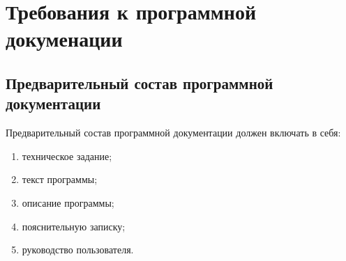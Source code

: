 \documentclass[a4paper,14pt]{extreport}
\begin{document}
	\section{Требования к программной докуменации}
	\subsection{Предварительный состав программной документации}
	\label{subsection:documentation}
	Предварительный состав программной документации должен включать в себя\cite{gostr-9294}:
\begin{enumerate}
	\item техническое задание;
	\item текст программы;
	\item описание программы;
	\item пояснительную записку\cite{methodVKR,methodVKRUrFU};
	\item руководство пользователя.
\end{enumerate}
	
	
	

	
\end{document}
